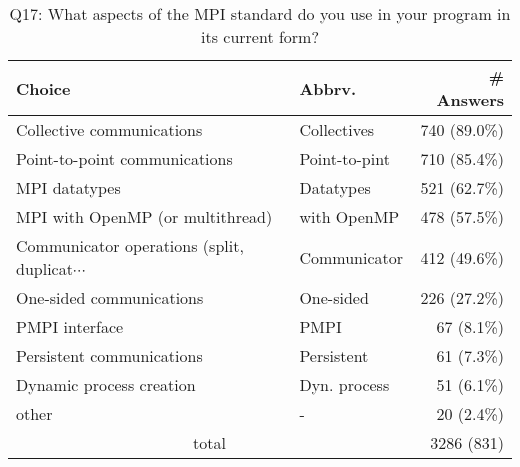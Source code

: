 \begin{table}[htb]%
\begin{center}%
\caption{Q17: What aspects of the MPI standard do you use in your program in its current form?}%
\label{tab:Q17-ans}%
\begin{tabular}{l|l|r}%
\hline%
Choice & Abbrv. & \# Answers \\%
\hline%
Collective communications & Collectives & 740 (89.0\%) \\%
Point-to-point communications & Point-to-pint & 710 (85.4\%) \\%
MPI datatypes & Datatypes & 521 (62.7\%) \\%
MPI with OpenMP (or multithread) & with OpenMP & 478 (57.5\%) \\%
{\small Communicator operations (split, duplicat$\cdots$} & Communicator & 412 (49.6\%) \\%
One-sided communications & One-sided & 226 (27.2\%) \\%
PMPI interface & PMPI & 67 (8.1\%) \\%
Persistent communications & Persistent & 61 (7.3\%) \\%
Dynamic process creation & Dyn. process & 51 (6.1\%) \\%
other & - & 20 (2.4\%) \\%
\hline%
\multicolumn{2}{c}{total} & 3286 (831)\\%
\hline%
\end{tabular}%
\end{center}%
\end{table}%
